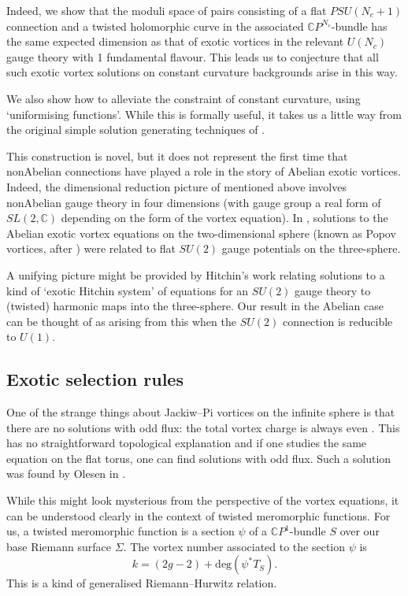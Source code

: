 \documentclass[10pt]{article}
\theoremstyle{definition}
\begin{document}
Indeed, we show that the moduli space of pairs consisting of a flat \(PSU(N_c+1)\) connection and a twisted holomorphic curve in the associated \(\mathbb{C}P^{N_c}\)-bundle has the same expected dimension as that of exotic vortices in the relevant \(U(N_c)\) gauge theory with 1 fundamental flavour. This leads us to conjecture that all such exotic vortex solutions on constant curvature backgrounds arise in this way.

We also show how to alleviate the constraint of constant curvature, using `uniformising functions'. While this is formally useful, it takes us a little way from the original simple solution generating techniques of \cite{mantonFVE}.


This construction is novel, but it does not represent the first time that nonAbelian connections have played a role in the story of Abelian exotic vortices. Indeed, the dimensional reduction picture of \cite{wittenMPS,contattoMF} mentioned above involves nonAbelian gauge theory in four dimensions (with gauge group a real form of \(SL(2,\mathbb{C})\) depending on the form of the vortex equation). In \cite{rossMZM}, solutions to the Abelian exotic vortex equations on the two-dimensional sphere (known as Popov vortices, after \cite{popovIV}) were related to flat \(SU(2)\) gauge potentials on the three-sphere. 

A unifying picture might be provided by Hitchin's work \cite{hitchinHM} relating solutions to a kind of `exotic Hitchin system' of equations for an \(SU(2)\) gauge theory to (twisted) harmonic maps into the three-sphere. Our result in the Abelian case can be thought of as arising from this when the \(SU(2)\) connection is reducible to \(U(1)\).

\subsection{Exotic selection rules}

One of the strange things about Jackiw--Pi vortices on the infinite sphere is that there are no solutions with odd flux: the total vortex charge is always even \cite{horvathyVS}. This has no straightforward topological explanation and if one studies the same equation on the flat torus, one can find solutions with odd flux. Such a solution was found by Olesen in \cite{olesenSC}.

While this might look mysterious from the perspective of the vortex equations, it can be understood clearly in the context of twisted meromorphic functions. For us, a twisted meromorphic function is a section \(\psi\) of a \(\mathbb{C}P^1\)-bundle \(S\) over our base Riemann surface \(\Sigma\). The vortex number associated to the section \(\psi\) is 
\[
k = (2g-2) + \text{deg}(\psi^*T_S) \text{.}
\]
This is a kind of generalised Riemann--Hurwitz relation.
\end{document}
